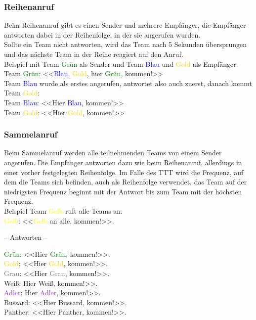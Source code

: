 \subsubsection{Reihenanruf}
Beim Reihenanruf gibt es einen Sender und mehrere Empfänger, die Empfänger antworten dabei in der Reihenfolge, in der sie angerufen wurden. \\
Sollte ein Team nicht antworten, wird das Team nach 5 Sekunden übersprungen und das nächste Team in der Reihe reagiert auf den Anruf. \\
Beispiel mit Team \textcolor{green}{Grün} als Sender und Team \textcolor{blue}{Blau} und \textcolor{gold}{Gold} als Empfänger. \\
Team \textcolor{green}{Grün}: <<\textcolor{blue}{Blau}, \textcolor{gold}{Gold}, hier \textcolor{green}{Grün}, kommen!>> \\
Team \textcolor{blue}{Blau} wurde als erstes angerufen, antwortet also auch zuerst, danach kommt Team \textcolor{gold}{Gold}: \\
Team \textcolor{blue}{Blau}: <<Hier \textcolor{blue}{Blau}, kommen!>> \\
Team \textcolor{gold}{Gold}: <<Hier \textcolor{gold}{Gold}, kommen!>> \\

\subsubsection{Sammelanruf}
Beim Sammelanruf werden alle teilnehmenden Teams von einem Sender angerufen. Die Empfänger antworten dazu wie beim Reihenanruf, allerdings in einer vorher festgelegten Reihenfolge. Im Falle des TTT wird die Frequenz, auf dem die Teams sich befinden, auch als Reihenfolge verwendet, das Team auf der niedrigsten Frequenz beginnt mit der Antwort bis zum Team mit der höchsten Frequenz. \\
Beispiel Team \textcolor{yellow}{Gelb} ruft alle Teams an: \\
\textcolor{yellow}{Gelb}: <<\textcolor{yellow}{Gelb} an alle, kommen!>>. \\
\begin{center}
– Antworten – \\
\end{center}
\textcolor{green}{Grün}: <<Hier \textcolor{green}{Grün}, kommen!>>. \\
\textcolor{gold}{Gold}: <<Hier \textcolor{gold}{Gold}, kommen!>>. \\
\textcolor{gray}{Grau}: <<Hier \textcolor{gray}{Grau}, kommen!>>. \\
Weiß: Hier Weiß, kommen!>>. \\
\textcolor{DarkOrchid}{Adler}: Hier \textcolor{DarkOrchid}{Adler}, kommen!>>. \\
Bussard: <<Hier Bussard, kommen!>>. \\
Panther: <<Hier Panther, kommen!>>. \\

